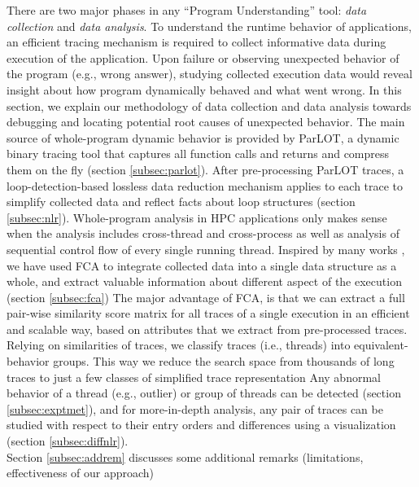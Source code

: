There are two major phases in any ``Program Understanding'' tool: \textit{data collection} and \textit{data analysis}.
%
To understand the runtime behavior of applications, an efficient tracing mechanism is required to collect informative data during execution of the application.
%
Upon failure or observing unexpected behavior of the program (e.g., wrong answer), studying collected execution data would reveal insight about how program dynamically behaved and what went wrong.
%
In this section, we explain our methodology of data collection and data analysis towards debugging and locating potential root causes of unexpected behavior.
%
The main source of whole-program dynamic behavior is provided by ParLOT, a dynamic binary tracing tool that captures all function calls and returns and compress them on the fly (section \ref{subsec:parlot}).
%
After pre-processing ParLOT traces, a loop-detection-based lossless data reduction mechanism applies to each trace to
simplify collected data and reflect facts about loop structures (section \ref{subsec:nlr}).
%
Whole-program analysis in HPC applications only makes sense when the analysis includes cross-thread and cross-process as well as analysis of sequential control flow of every single running thread.
%
Inspired by many works\cite{weberStructural} \cite{Alqadah2011} \cite{Ignatov17}\cite{latticeForDistConst}, we have used FCA\cite{clbook} to integrate collected data into a single data structure as a whole, and extract valuable information about different aspect of the execution (section \ref{subsec:fca})
%
The major advantage of FCA, is that we can extract a full pair-wise similarity score matrix for all traces of a single execution in an efficient and scalable way, based on attributes that we extract from pre-processed traces.
%
Relying on similarities of traces, we classify traces (i.e., threads) into equivalent-behavior groups.
%
This way we reduce the search space from thousands of long traces to just a few classes of simplified trace representation
%
Any abnormal behavior of a thread (e.g., outlier) or group of threads can be detected (section \ref{subsec:exptmet}),
%
and for more-in-depth analysis, any pair of traces can be studied with respect to their entry orders and differences using a visualization (section \ref{subsec:diffnlr}).
%
\\
Section \ref{subsec:addrem} discusses some additional remarks (limitations, effectiveness of our approach)
\\
%


